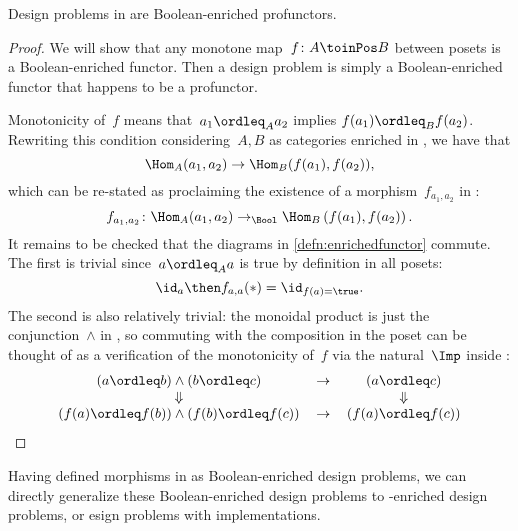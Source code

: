 \begin{proposition}
    Design problems in \DP are Boolean-enriched profunctors.
\end{proposition}
\begin{proof}
    We will show that any monotone map~$f\colon A \toinPos B$ between posets is a Boolean-enriched functor. Then a design problem is simply a Boolean-enriched functor that happens to be a profunctor.

    Monotonicity of~$f$ means that~$a_1 \ordleq_A a_2$ implies $f(a_1) \ordleq_B f(a_2)$. Rewriting this condition considering~$A, B$ as categories enriched in \Bool, we have that
    \begin{equation}
        \Hom_A(a_1, a_2) \to \Hom_B(f(a_1), f(a_2)),
    \end{equation}
    which can be re-stated as proclaiming the existence of a morphism~$f_{a_1, a_2}$ in \Bool:
    \begin{equation}
        f_{a_1, a_2} \colon \Hom_A(a_1, a_2) \to_{\Bool} \Hom_B\left(f(a_1), f(a_2)\right) .
    \end{equation}
    It remains to be checked that the diagrams in \cref{defn:enrichedfunctor} commute. The first is trivial since~$a \ordleq_A a$ is true by definition in all posets:
    \begin{equation}
        \id_{a} \then f_{a,a} (\ast) = \id_{f(a) = \true}.
    \end{equation}
    The second is also relatively trivial: the monoidal product is just the conjunction~$\wedge$ in \Bool, so commuting with the composition in the poset can be thought of as a verification of the monotonicity of~$f$ via the natural~$\Imp$ inside \Bool:
    \begin{equation}
        \begin{tabular}{ccc}
            $(a \ordleq b) \wedge (b \ordleq c)$             & $\to$ & $(a \ordleq c)$       \\
            $\Downarrow$                                     &       & $\Downarrow$          \\
            $(f(a) \ordleq f(b)) \wedge (f(b) \ordleq f(c))$ & $\to$ & $(f(a) \ordleq f(c))$
        \end{tabular}
    \end{equation}
\end{proof}

Having defined morphisms in \DP as Boolean-enriched design problems, we can directly generalize these Boolean-enriched design problems to \Set-enriched design problems, or esign problems with implementations.

